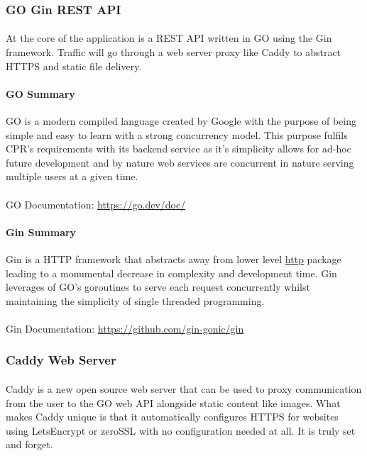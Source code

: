 \subsubsection{GO Gin REST API}
\paragraph{}
At the core of the application is a REST API written in GO using the Gin framework.
Traffic will go through a web server proxy like Caddy to abstract HTTPS and static file delivery.

\paragraph{GO Summary}
GO is a modern compiled language created by Google with the purpose of being simple and easy to learn with a strong concurrency model.
This purpose fulfils CPR's requirements with its backend service as it's simplicity allows for ad-hoc future development and by nature web services
are concurrent in nature serving multiple users at a given time.

\paragraph{} GO Documentation: \url{https://go.dev/doc/}

\paragraph{Gin Summary}
Gin is a HTTP framework that abstracts away from lower level \href{https://pkg.go.dev/net/http}{http} package leading to a monumental decrease
in complexity and development time.
Gin leverages of GO's goroutines to serve each request concurrently whilst maintaining the simplicity of single threaded programming.

\paragraph{} Gin Documentation: \url{https://github.com/gin-gonic/gin}



\subsubsection{Caddy Web Server}
\paragraph{}
Caddy is a new open source web server that can be used to proxy communication from the user to the GO web API alongside static
content like images.
What makes Caddy unique is that it automatically configures HTTPS for websites using LetsEncrypt or zeroSSL with no configuration
needed at all.
It is truly set and forget.

